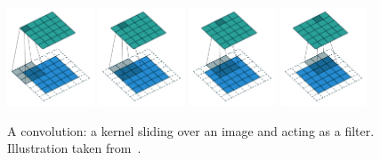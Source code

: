 \begin{figure}[ht]
  \centering
  \includegraphics[width=0.23\textwidth]{figures/main/ch2-background/conv_00.pdf}
  \hfill
  \includegraphics[width=0.23\textwidth]{figures/main/ch2-background/conv_01.pdf}
  \hfill
  \includegraphics[width=0.23\textwidth]{figures/main/ch2-background/conv_02.pdf}
  \hfill
  \includegraphics[width=0.23\textwidth]{figures/main/ch2-background/conv_03.pdf}
  \caption{A convolution: a kernel sliding over an image and acting as a filter. \\Illustration taken from~\citet{dumoulin2016guide}.}
  \label{figure:illustration_convolution}
\end{figure}


%
%
%



